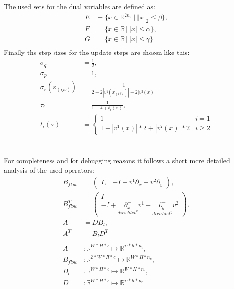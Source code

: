 \documentclass[A4,12pt]{article}
\DeclareMathOperator*{\argmin}{arg\,min}
\newcommand{\R}{\mathbb{R}}
\newcommand{\norm}[1]{\Vert #1 \Vert}
\begin{document}
The used sets for the dual variables are defined as:
\begin{equation}
\begin{aligned}
E &= \{x \in \R^{2n_c} ~|~ \norm{x}_2 \leq \beta \}, \\
F &= \{x \in \R ~|~ |x| \leq \alpha \}, \\
G &= \{x \in \R ~|~ |x| \leq \gamma \} \\
\end{aligned}
\end{equation}
Finally the step sizes for the update steps are chosen like this:
\begin{equation}
\begin{aligned}
\sigma_q &= \frac{1}{2}, \\
\sigma_p &= 1, \\
\sigma_r (x_{(ijc)}) &= \frac{1}{2+2|v^1(x_{(ij)})|+2|v^2(x)|} \\
\tau_i&=\frac{1}{1+4+t_i(x)}, \\
t_i(x)&=\begin{cases} 1 & i=1 \\ 1+|v^1(x)|*2+|v^2(x)|*2 & i \geq 2 \end{cases}
\end{aligned}
\end{equation}
\\\\
For completeness and for debugging reasons it follows a short more detailed analysis of the used operators:
\begin{equation}
\begin{aligned}
B_{flow}&=\begin{pmatrix}I, &-I-v^1\partial_x-v^2\partial_y\end{pmatrix}, \\
B_{flow}^T&=\begin{pmatrix}I \\ -I+\underset{dirichlet^x} {\partial^-_x} v^1+\underset{dirichlet^y}{\partial^-_y} v^2\end{pmatrix}, \\
A&=DB_l, \\
A^T&=B_lD^T \\\\
A&\colon\R^{W*H*c}\mapsto\R^{w*h*n_c}, \\
B_{flow}&\colon\R^{2*W*H*c}\mapsto\R^{W*H*n_c}, \\
B_l&\colon\R^{W*H*c}\mapsto\R^{W*H*n_c}, \\
D&\colon\R^{W*H*c}\mapsto\R^{w*h*n_c} \\
\end{aligned}
\end{equation}



\end{document}
